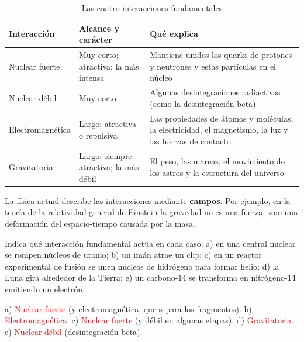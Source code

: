 \begin{table}[H]
    \centering
    \caption{Las cuatro interacciones fundamentales}
    \vspace{-5pt}
    \begin{tabular}{@{}lL{3.2cm}L{6.4cm}@{}}
        \toprule
        \textbf{Interacción} & \textbf{Alcance y carácter} & \textbf{Qué explica} \\
        \midrule
        Nuclear fuerte & Muy corto; atractiva; la más intensa & Mantiene unidos los quarks de protones y neutrones y estas
        partículas en el núcleo \\[3pt]
        Nuclear débil & Muy corto & Algunas desintegraciones radiactivas (como la desintegración beta) \\[3pt]
        Electromagnética & Largo; atractiva o repulsiva & Las propiedades de átomos y moléculas, la electricidad, el magnetismo, la
        luz y las fuerzas de contacto \\[3pt]
        Gravitatoria & Largo; siempre atractiva; la más débil & El peso, las mareas, el movimiento de los astros y la estructura del
        universo \\
        \bottomrule
    \end{tabular}
    \label{tab:ud10-interacciones}
\end{table}

\begin{remark}
    La física actual describe las interacciones mediante \textbf{campos}. Por ejemplo, en la teoría de la relatividad general de
    Einstein la gravedad no es una fuerza, sino una deformación del espacio-tiempo causada por la masa.
\end{remark}

\begin{exercise}
    Indica qué interacción fundamental actúa en cada caso: a) en una central nuclear se rompen núcleos de uranio; b) un imán atrae
    un clip; c) en un reactor experimental de fusión se unen núcleos de hidrógeno para formar helio; d) la Luna gira alrededor de la
    Tierra; e) un carbono-14 se transforma en nitrógeno-14 emitiendo un electrón.
    \begin{solu}
        a) \textcolor{red}{Nuclear fuerte} (y electromagnética, que separa los fragmentos). b) \textcolor{red}{Electromagnética}.
        c) \textcolor{red}{Nuclear fuerte} (y débil en algunas etapas). d) \textcolor{red}{Gravitatoria}. e) \textcolor{red}{Nuclear
        débil} (desintegración beta).
    \end{solu}
\end{exercise}

